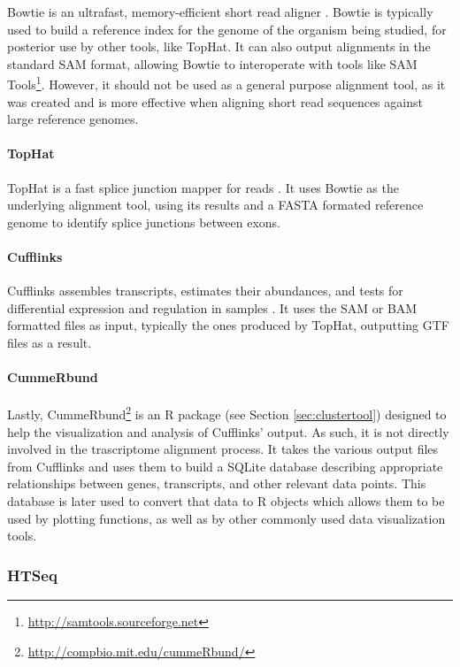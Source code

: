 Bowtie is an ultrafast, memory-efficient short read aligner
\cite{langmead2009ultrafast}. Bowtie is typically used to build a reference
index for the genome of the organism being studied, for posterior use by other
tools, like TopHat. It can also output alignments in the standard SAM format,
allowing Bowtie to interoperate with tools like SAM
Tools\footnote{\url{http://samtools.sourceforge.net}}. However, it should not be
used as a general purpose alignment tool, as it was created and is more
effective when aligning short read sequences against large reference genomes.

\paragraph{TopHat}

TopHat is a fast splice junction mapper for \rnaseq{} reads
\cite{Trapnell01052009}. It uses Bowtie as the underlying alignment tool, using
its results and a FASTA formated reference genome to identify splice junctions
between exons.

\paragraph{Cufflinks}

Cufflinks assembles transcripts, estimates their abundances, and tests for
differential expression and regulation in \rnaseq{} samples
\cite{trapnell2010transcript}. It uses the SAM or BAM formatted files as input,
typically the ones produced by TopHat, outputting GTF files as a result.

\paragraph{CummeRbund}

Lastly, CummeRbund\footnote{\url{http://compbio.mit.edu/cummeRbund/}} is an R
package (see Section \ref{sec:clustertool}) designed to help the visualization and
analysis of Cufflinks' \rnaseq{} output. As such, it is not directly involved in
the trascriptome alignment process. It takes the various output files from
Cufflinks and uses them to build a SQLite database describing appropriate
relationships between genes, transcripts, and other relevant data points. This
database is later used to convert that data to R objects which allows them to be
used by plotting functions, as well as by other commonly used data visualization
tools.

\subsubsection*{HTSeq}

